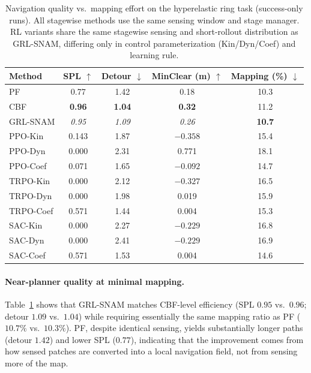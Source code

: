 \begin{table}[h!]
\centering
\caption{Navigation quality vs.\ mapping effort on the hyperelastic ring task (success-only runs). 
All stagewise methods use the same sensing window and stage manager. RL variants share the same stagewise sensing and short-rollout distribution as GRL-SNAM, differing only in control parameterization (Kin/Dyn/Coef) and learning rule.}
\vspace{0.4em}
\begin{tabular}{lcccc}
\toprule
Method       & SPL $\uparrow$ & Detour $\downarrow$ & MinClear (m) $\uparrow$ & Mapping (\%) $\downarrow$ \\
\midrule
PF           & 0.77     & 1.42 & 0.18           & 10.3 \\
CBF          & \textbf{0.96}     & \textbf{1.04} & \textbf{0.32}  & 11.2 \\
GRL-SNAM     & \textit{0.95} & \textit{1.09} & \textit{0.26} & \textbf{10.7} \\
\midrule
PPO-Kin      & 0.143    & 1.87 & $-0.358$       & 15.4 \\
PPO-Dyn      & 0.000    & 2.31 & 0.771          & 18.1 \\
PPO-Coef     & 0.071    & 1.65 & $-0.092$       & 14.7 \\
TRPO-Kin     & 0.000    & 2.12 & $-0.327$       & 16.5 \\
TRPO-Dyn     & 0.000    & 1.98 & 0.019          & 15.9 \\
TRPO-Coef    & 0.571    & 1.44 & 0.004          & 15.3 \\
SAC-Kin      & 0.000    & 2.27 & $-0.229$       & 16.8 \\
SAC-Dyn      & 0.000    & 2.41 & $-0.229$       & 16.9 \\
SAC-Coef     & 0.571    & 1.53 & 0.004          & 14.6 \\
\bottomrule
\end{tabular}
\label{tab:success_only}
\end{table}

\paragraph{Near-planner quality at minimal mapping.}
Table~\ref{tab:success_only} shows that GRL-SNAM matches CBF-level efficiency (SPL $0.95$ vs.\ $0.96$; detour $1.09$ vs.\ $1.04$) while requiring essentially the same mapping ratio as PF ($10.7\%$ vs.\ $10.3\%$). 
PF, despite identical sensing, yields substantially longer paths (detour $1.42$) and lower SPL ($0.77$), indicating that the improvement comes from how sensed patches are converted into a local navigation field, not from sensing more of the map.

